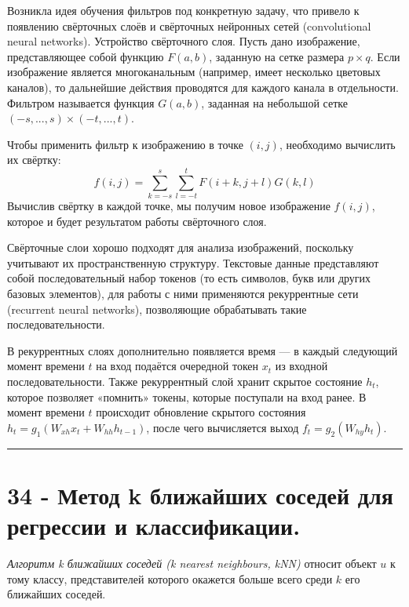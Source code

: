 \documentclass[11pt]{article}
\begin{document}
Возникла идея обучения фильтров под конкретную задачу, что привело к
появлению свёрточных слоёв и свёрточных нейронных сетей (convolutional
neural networks). Устройство свёрточного слоя. Пусть дано изображение,
представляющее собой функцию \(F(a, b)\), заданную на сетке размера
\(p × q\). Если изображение является многоканальным (например, имеет
несколько цветовых каналов), то дальнейшие действия проводятся для
каждого канала в отдельности. Фильтром называется функция \(G(a, b)\),
заданная на небольшой сетке \((−s,...,s) × (−t,...,t)\).

Чтобы применить фильтр к изображению в точке \((i, j)\), необходимо
вычислить их свёртку:
\[f(i, j) = \sum_{k=−s}^s \sum_{l=−t}^tF(i + k, j + l)G(k, l)\] Вычислив
свёртку в каждой точке, мы получим новое изображение \(f(i, j)\),
которое и будет результатом работы свёрточного слоя.

Свёрточные слои хорошо подходят для анализа изображений, поскольку
учитывают их пространственную структуру. Текстовые данные представляют
собой последовательный набор токенов (то есть символов, букв или других
базовых элементов), для работы с ними применяются рекуррентные сети
(recurrent neural networks), позволяющие обрабатывать такие
последовательности.

В рекуррентных слоях дополнительно появляется время --- в каждый
следующий момент времени \(t\) на вход подаётся очередной токен \(x_t\)
из входной последовательности. Также рекуррентный слой хранит скрытое
состояние \(h_t\), которое позволяет «помнить» токены, которые поступали
на вход ранее. В момент времени \(t\) происходит обновление скрытого
состояния \(h_t = g_1(W_{xh}x_t + W_{hh}h_{t−1})\), после чего
вычисляется выход \(f_t = g_2(W_{hy}h_t)\).

    \begin{center}\rule{0.5\linewidth}{\linethickness}\end{center}

    \section{34 - Метод k ближайших соседей для регрессии и
классификации.}\label{ux43cux435ux442ux43eux434-k-ux431ux43bux438ux436ux430ux439ux448ux438ux445-ux441ux43eux441ux435ux434ux435ux439-ux434ux43bux44f-ux440ux435ux433ux440ux435ux441ux441ux438ux438-ux438-ux43aux43bux430ux441ux441ux438ux444ux438ux43aux430ux446ux438ux438.}

\emph{Алгоритм k ближайших соседей (k nearest neighbours, kNN)} относит
объект \(u\) к тому классу, представителей которого окажется больше
всего среди \(k\) его ближайших соседей.
\end{document}
